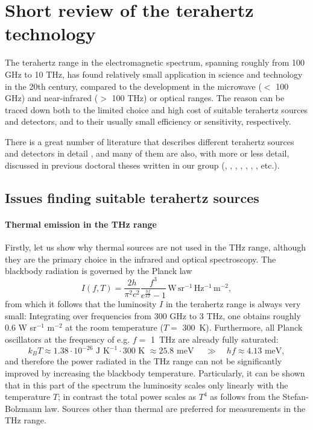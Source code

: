 \section{Short review of the terahertz technology}
The terahertz range in the electromagnetic spectrum, spanning roughly from 100 GHz to 10 THz, has found relatively small application in science and technology in the 20th century, compared to the development in the microwave ($<$ 100 GHz) and near-infrared ($>$ 100 THz) or optical ranges. The reason can be traced down both to the limited choice and high cost of suitable terahertz sources and detectors, and to their usually small efficiency or sensitivity, respectively. 


There is a great number of literature that describes different terahertz sources and detectors in detail \cite[pp. 155-158]{lee2008book}, %
and many of them are also, with more or less detail, discussed in previous doctoral theses written in our group (\cite[pp. 2-30]{pashkin2004phd}, \cite[pp. 19-25]{nemec2006phd}, \cite[pp. 7-26]{fekete2008phd}, \cite[pp. 11-21]{sibik2010dp}, \cite[pp. 31-45]{yahiaoui2011phd}, \cite[pp. 33-38]{mics2012phd}, \cite[pp. 25-33]{skoromets2013phd}, etc.).

\subsection{Issues finding suitable terahertz sources}
\paragraph{Thermal emission in the THz range}
Firstly, let us show why thermal sources are not used in the THz range, although they are the primary choice in the infrared and optical spectroscopy. The blackbody radiation is governed by the Planck law %
\begin{equation}I(f, T) = \frac{2 h}{\pi^2 c^2}\frac{f^3}{e^{\frac{h f}{kT}}-1} \mathrm{\,W\,sr^{-1}\,Hz^{-1}\,m^{-2}}, \label{eq_planck}\end{equation}
from which it follows that the luminosity $I$ in the terahertz range is always very small: Integrating over frequencies from 300 GHz to 3 THz, one obtains roughly 0.6 W sr$^{-1}$ m$^{-2}$ at the room temperature ($T=$ 300~K).  Furthermore, all Planck oscillators at the frequency of e.g. $f =$ 1~THz are already fully saturated:
$$k_B T \approx 1.38\cdot 10^{-26} \text{ J K}^{-1} \cdot 300 \text{ K~} \approx 25.8 \text{ meV } \quad\gg\quad h f \approx 4.13 \text{ meV}, $$
and therefore the power radiated in the THz range can not be significantly improved by increasing the blackbody temperature. Particularly, it can be shown that in this part of the spectrum the luminosity scales only linearly with the temperature $T$; in contrast the total power scales as $T^{4}$ as follows from the Stefan-Bolzmann law. Sources other than thermal are preferred for measurements in the THz range.

